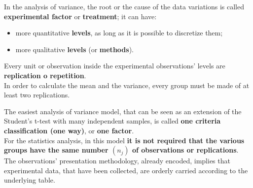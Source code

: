 \begin{frame}
  \vspace*{.25cm}
  In the analysis of variance, the root or the cause of the data variations is called \textbf{experimental factor} or \textbf{treatment}; it can have:
  \vspace*{.25cm}
  \begin{itemize}
    \item more quantitative \textbf{levels}, as long as it is possible to discretize them;
    \vspace*{.25cm}
    \item more qualitative \textbf{levels} (or \textbf{methods}).
  \end{itemize}
  \vspace*{.25cm}
  Every unit or observation inside the experimental observations' levels are \textbf{replication o repetition}.\\
  \vspace*{.25cm}
  In order to calculate the mean and the variance, every group must be made of at least two replications.
\end{frame}




\begin{frame}
  \vspace*{.5cm}
  The easiest analysis of variance model, that can be seen as an extension of the Student's t-test with many independent samples, is called \textbf{one criteria classification (one way)}, or \textbf{one factor}.\\
  \vspace*{.75cm}
  For the statistics analysis, in this model \textbf{it is not required that the various groups have the same number {\boldmath $ (n_j) $} of observations or replications}.\\
  \vspace*{.75cm}
  The observations' presentation methodology, already encoded, implies that experimental data, that have been collected, are orderly carried according to the underlying table.
\end{frame}

